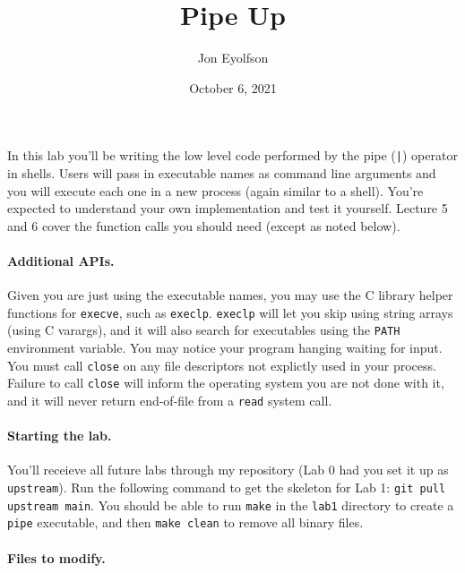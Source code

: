 

\title{Pipe Up}
\author{Jon Eyolfson}
\date{October 6, 2021}



\maketitle

In this lab you'll be writing the low level code performed by the pipe
(\texttt{|}) operator in shells.
Users will pass in executable names as command line arguments and you will
execute each one in a new process (again similar to a shell).
You're expected to understand your own implementation and test it yourself.
Lecture 5 and 6 cover the function calls you should need (except as noted
below).

\paragraph{Additional APIs.}

Given you are just using the executable names, you may use the C library helper
functions for \texttt{execve}, such as \texttt{execlp}.
\texttt{execlp} will let you skip using string arrays (using C varargs), and it
will also search for executables using the \texttt{PATH} environment variable.
You may notice your program hanging waiting for input.
You must call \texttt{close} on any file descriptors not explictly used in
your process.
Failure to call \texttt{close} will inform the operating system you are not done
with it, and it will never return end-of-file from a \texttt{read} system call.

\paragraph{Starting the lab.}

You'll receieve all future labs through my repository (Lab 0 had you set it up
as \texttt{upstream}).
Run the following command to get the skeleton for Lab 1:
\texttt{git pull upstream main}.
You should be able to run \texttt{make} in the \texttt{lab1} directory to
create a \texttt{pipe} executable, and then \texttt{make clean} to remove all
binary files.

\paragraph{Files to modify.}

